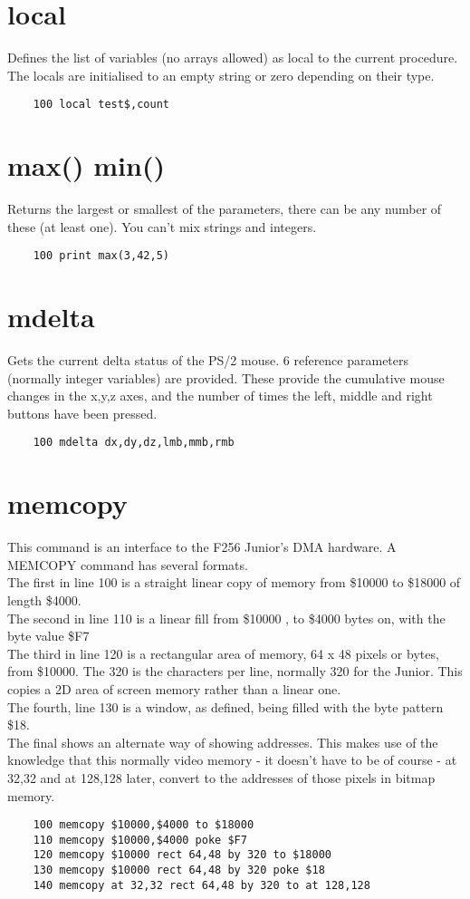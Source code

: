 \section*{local}
Defines the list of variables (no arrays allowed) as local to the current procedure. The locals are initialised to an empty string or zero depending on their type. 
\example{}
\begin{verbatim}
	100 local test$,count
\end{verbatim}

\section*{max() min()}
Returns the largest or smallest of the parameters, there can be any number of these (at least one). You can’t mix strings and integers.
\example{}
\begin{verbatim}
	100 print max(3,42,5)
\end{verbatim}

\section*{mdelta}
Gets the current delta status of the PS/2 mouse. 6 reference parameters (normally integer variables) are provided. These provide the cumulative mouse changes in the x,y,z axes, and the number of times the left, middle and right buttons have been pressed.
\example{}
\begin{verbatim}
	100 mdelta dx,dy,dz,lmb,mmb,rmb
\end{verbatim}

\section*{memcopy}
This command is an interface to the F256 Junior's DMA hardware. A MEMCOPY command has several formats. \\
The first in line 100 is a straight linear copy of memory from \$10000 to \$18000 of length \$4000.\\ The second in line 110 is a linear fill from \$10000 , to \$4000 bytes on, with the byte value \$F7 \\
The third in line 120 is a rectangular area of memory, 64 x 48 pixels or bytes, from \$10000. The 320 is the characters per line, normally 320 for the Junior. This copies a 2D area of screen memory rather than a linear one. \\
The fourth, line 130 is a window, as defined, being filled with the byte pattern \$18. \\
The final shows an alternate way of showing addresses. This makes use of the knowledge that this normally video memory - it doesn't have to be of course - at 32,32 and at 128,128 later, convert to the addresses of those pixels in bitmap memory.
\begin{verbatim}
	100 memcopy $10000,$4000 to $18000
	110 memcopy $10000,$4000 poke $F7
	120 memcopy $10000 rect 64,48 by 320 to $18000
	130 memcopy $10000 rect 64,48 by 320 poke $18
	140 memcopy at 32,32 rect 64,48 by 320 to at 128,128
\end{verbatim}

